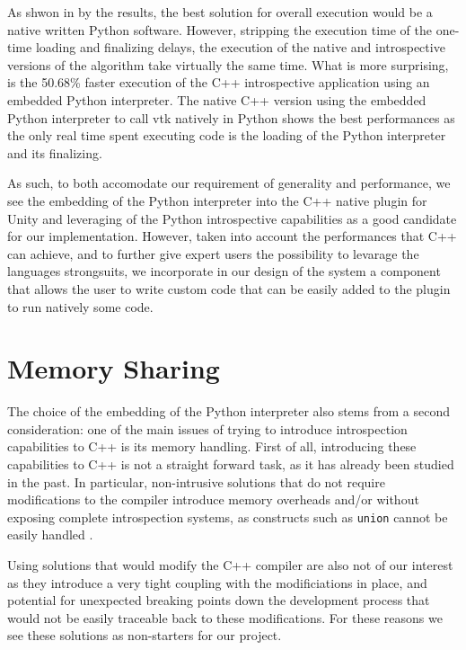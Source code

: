 As shwon in by the results, the best solution for overall execution would be a native written Python software. However, stripping the execution time of the one-time loading and finalizing delays, the execution of the native and introspective versions of the algorithm take virtually the same time. What is more surprising, is the 50.68\% faster execution of the C++ introspective application using an embedded Python interpreter. The native C++ version using the embedded Python interpreter to call \acrshort{vtk} natively in Python shows the best performances as the only real time spent executing code is the loading of the Python interpreter and its finalizing.

As such, to both accomodate our requirement of generality and performance, we see the embedding of the Python interpreter into the C++ native plugin for Unity and leveraging of the Python introspective capabilities as a good candidate for our implementation. However, taken into account the performances that C++ can achieve, and to further give expert users the possibility to levarage the languages strongsuits, we incorporate in our design of the system a component that allows the user to write custom code that can be easily added to the plugin to run natively some code.

\section{Memory Sharing}

The choice of the embedding of the Python interpreter also stems from a second consideration: one of the main issues of trying to introduce introspection capabilities to C++ is its memory handling. First of all, introducing these capabilities to C++ is not a straight forward task, as it has already been studied in the past. In particular, non-intrusive solutions that do not require modifications to the compiler introduce memory overheads \cite{bayser2012rtti} and/or without exposing complete introspection systems, as constructs such as \verb|union| cannot be easily handled \cite{tyng1998nonintrusive}.

Using solutions that would modify the C++ compiler are also not of our interest as they introduce a very tight coupling with the modificiations in place, and potential for unexpected breaking points down the development process that would not be easily traceable back to these modifications. For these reasons we see these solutions as non-starters for our project.

